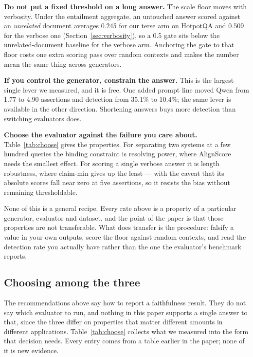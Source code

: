 \documentclass[11pt]{article}
\begin{document}
\textbf{Do not put a fixed threshold on a long answer.} The scale floor moves with verbosity. Under the entailment aggregate, an untouched answer scored against an \emph{unrelated} document averages 0.245 for our terse arm on HotpotQA and 0.509 for the verbose one (Section~\ref{sec:verbosity}), so a 0.5 gate sits below the unrelated-document baseline for the verbose arm. Anchoring the gate to that floor costs one extra scoring pass over random contexts and makes the number mean the same thing across generators.

\textbf{If you control the generator, constrain the answer.} This is the largest single lever we measured, and it is free. One added prompt line moved Qwen from 1.77 to 4.90 assertions and detection from 35.1\% to 10.4\%; the same lever is available in the other direction. Shortening answers buys more detection than switching evaluators does.

\textbf{Choose the evaluator against the failure you care about.} Table~\ref{tab:choose} gives the properties. For separating two systems at a few hundred queries the binding constraint is resolving power, where AlignScore needs the smallest effect. For scoring a single verbose answer it is length robustness, where claim-min gives up the least --- with the caveat that its absolute scores fall near zero at five assertions, so it resists the bias without remaining thresholdable.

None of this is a general recipe. Every rate above is a property of a particular generator, evaluator and dataset, and the point of the paper is that those properties are not transferable. What does transfer is the procedure: falsify a value in your own outputs, score the floor against random contexts, and read the detection rate you actually have rather than the one the evaluator's benchmark reports.


\subsection{Choosing among the three}
\label{sec:choosing}

The recommendations above say how to report a faithfulness result. They do not say which evaluator to run, and nothing in this paper supports a single answer to that, since the three differ on properties that matter different amounts in different applications. Table~\ref{tab:choose} collects what we measured into the form that decision needs. Every entry comes from a table earlier in the paper; none of it is new evidence.
\end{document}
